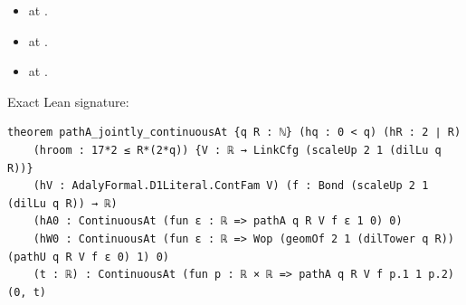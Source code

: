 \begin{theorem}[bp-327]
\begin{itemize}
\item \texttt{} at \texttt{}.
\item \texttt{} at \texttt{}.
\item \texttt{} at \texttt{}.
\end{itemize}
\par Exact Lean signature:
\begin{verbatim}
theorem pathA_jointly_continuousAt {q R : ℕ} (hq : 0 < q) (hR : 2 ∣ R)
    (hroom : 17*2 ≤ R*(2*q)) {V : ℝ → LinkCfg (scaleUp 2 1 (dilLu q R))}
    (hV : AdalyFormal.D1Literal.ContFam V) (f : Bond (scaleUp 2 1 (dilLu q R)) → ℝ)
    (hA0 : ContinuousAt (fun ε : ℝ => pathA q R V f ε 1 0) 0)
    (hW0 : ContinuousAt (fun ε : ℝ => Wop (geomOf 2 1 (dilTower q R)) (pathU q R V f ε 0) 1) 0)
    (t : ℝ) : ContinuousAt (fun p : ℝ × ℝ => pathA q R V f p.1 1 p.2) (0, t)
\end{verbatim}
\end{theorem}

